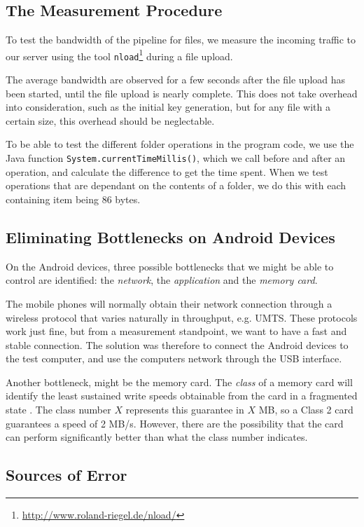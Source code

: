 \documentclass[pdftex,english,10pt,b5paper,twoside]{book}
\begin{document}
\subsection{The Measurement Procedure}

To test the bandwidth of the pipeline for files, we measure the incoming
traffic to our server using the tool \texttt{nload}\footnote{
\url{http://www.roland-riegel.de/nload/}} during a file upload. 

The average bandwidth are observed for a few seconds after the file upload has
been started, until the file upload is nearly complete. This does not take
overhead into consideration, such as the initial key generation, but for any
file with a certain size, this overhead should be neglectable.

To be able to test the different folder operations in the program code, we use
the Java function \texttt{System.currentTimeMillis()}, which we call before and
after an operation, and calculate the difference to get the time spent. When we
test operations that are dependant on the contents of a folder, we do this with
each containing item being 86 bytes.

\subsection{Eliminating Bottlenecks on Android Devices}

On the Android devices, three possible bottlenecks that we might be able to
control are identified: the \emph{network}, the \emph{application} and the
\emph{memory card}.

The mobile phones will normally obtain their network connection through a
wireless protocol that varies naturally in throughput, e.g. \ac{UMTS}. These
protocols work just fine, but from a measurement standpoint, we want to have a
fast and stable connection. The solution was therefore to connect the Android
devices to the test computer, and use the computers network through the
\ac{USB} interface.

Another bottleneck, might be the memory card. The \emph{class} of a memory card
will identify the least sustained write speeds obtainable from the card in a
fragmented state \cite{sdcard}. The class number $X$ represents this guarantee
in $X$ MB, so a Class 2 card guarantees a speed of 2 MB/s. However, there are
the possibility that the card can perform significantly better than what the
class number indicates.

\subsection{Sources of Error}
\end{document}
